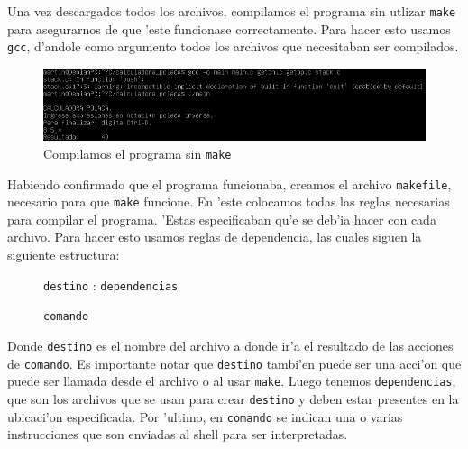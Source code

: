 \documentclass[11pt]{article}
\newcommand{\codetext}[2]{\large\texttt{\textcolor{#1}{#2}}}
\begin{document}
		Una vez descargados todos los archivos, compilamos el programa sin utlizar \texttt{make} para asegurarnos de que 'este funcionase correctamente. Para hacer esto usamos \texttt{gcc}, d'andole como argumento todos los archivos que necesitaban ser compilados.
		
		\begin{figure}[H]
				\centering
				\includegraphics[width=.9\linewidth]{Images/Seccion 2/S2 parte dos.PNG}
				\caption{Compilamos el programa sin \texttt{make}}
				\label{fig:makefile-gcc-compile}
		\end{figure}
	
		Habiendo confirmado que el programa funcionaba, creamos el archivo \texttt{makefile}, necesario para que \texttt{make} funcione. En 'este colocamos todas las reglas necesarias para compilar el programa. 'Estas especificaban qu'e se deb'ia hacer con cada archivo. Para hacer esto usamos reglas de dependencia, las cuales siguen la siguiente estructura:
		
		\begin{figure}[H]
			\centering
			\begin{code-box}
				{\large
					\codetext{light-blue}{destino} : \codetext{orange-desert-vim}{dependencias} \vspace{-2pt}
					
					\quad\codetext{light-red}{comando}
				}
			\end{code-box}
		\end{figure} \vspace{-12pt}
		
		Donde \texttt{\textcolor{light-blue}{destino}} es el nombre del archivo a donde ir'a el resultado de las acciones de \texttt{\textcolor{light-red}{comando}}. Es importante notar que \texttt{\textcolor{light-blue}{destino}} tambi'en puede ser una acci'on que puede ser llamada desde el archivo o al usar \texttt{make}. Luego tenemos \texttt{\textcolor{orange-desert-vim}{dependencias}}, que son los archivos que se usan para crear \texttt{\textcolor{light-blue}{destino}} y deben estar presentes en la ubicaci'on especificada. Por 'ultimo, en  \texttt{\textcolor{light-red}{comando}} se indican una o varias instrucciones que son enviadas al shell para ser interpretadas.
		
\end{document}
